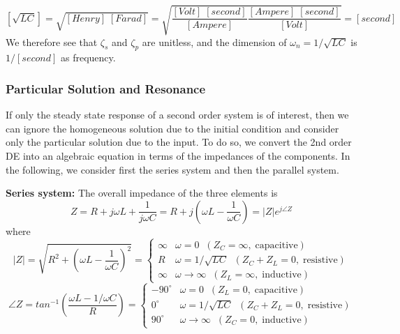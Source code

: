 \documentclass{article}
\begin{document}
\begin{equation} 
  \left[ \sqrt{LC} \right]=\sqrt{[Henry]\;[Farad]}
  =\sqrt{\frac{[Volt]\;[second]}{[Ampere]}\frac{[Ampere]\;[second]}{[Volt]}}
  =[second]
\end{equation}
We therefore see that $\zeta_s$ and $\zeta_p$ are unitless, and the
dimension of $\omega_n=1/\sqrt{LC}$ is $1/[second]$ as frequency.
\begin{comment}
  \begin{equation} 
    \left[\sqrt{\frac{L}{C}}\right]=\sqrt{\frac{H}{F}}
    =\sqrt{\frac{V\;s}{A}\;\;\frac{V}{s\;A}}=\frac{V}{A}=\Omega
  \end{equation}
  \begin{equation} 
    \left[\sqrt{LC}\right]=\sqrt{H\; F}=\sqrt{ \frac{V\;s}{A} \frac{A\;s}{V} }
    =s
  \end{equation}
\end{comment}



\subsubsection*{Particular Solution and Resonance}

If only the steady state response of a second order system is of interest, 
then we can ignore the homogeneous solution due to the initial condition 
and consider only the particular solution due to the input. To do so, we
convert the 2nd order DE into an algebraic equation in terms of the 
impedances of the components. In the following, we consider first the 
series system and then the parallel system.

{\bf Series system:} The overall impedance of the three elements is
\begin{equation} 
  Z=R+j\omega L+\frac{1}{j\omega C}=R+j\left(\omega L-\frac{1}{\omega C}\right)
  =|Z|e^{j\angle Z}	
\end{equation}
where 
\begin{equation} 
  |Z|=\sqrt{R^2+\left(\omega L-\frac{1}{\omega C}\right)^2}
  =\left\{ \begin{array}{rl} 
    \infty & \omega=0\;\; (Z_C=\infty,\;\mbox{capacitive})\\ 
    R & \omega=1/\sqrt{LC}\;\; (Z_C+Z_L=0,\;\mbox{resistive})\\
    \infty & \omega \rightarrow \infty\;\; (Z_L=\infty,\;\mbox{inductive})
  \end{array} \right. 
\end{equation}
\begin{equation}
  \angle Z=tan^{-1} \left(\frac{\omega L-1/\omega C}{R}\right)
  =\left\{ \begin{array}{rl} -90^\circ & \omega=0\;\; (Z_L=0,\;\mbox{capacitive})\\ 
    0^\circ & \omega=1/\sqrt{LC}\;\; (Z_C+Z_L=0,\;\mbox{resistive})\\
    90^\circ & \omega \rightarrow \infty\;\; (Z_C=0,\;\mbox{inductive})
  \end{array} \right. 
\end{equation}
\end{document}
